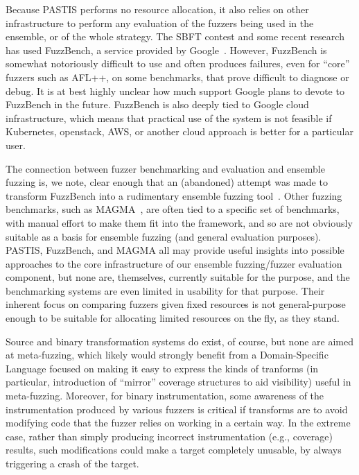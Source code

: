 Because PASTIS performs no resource allocation, it also relies on other 
infrastructure to perform any evaluation of the fuzzers being used in the 
ensemble, or of the whole strategy.  The SBFT contest and some recent research 
has used FuzzBench, a service provided by Google~\cite{metzman2021fuzzbench}.  However, FuzzBench is 
somewhat notoriously difficult to use and often produces failures, even for 
``core'' fuzzers such as AFL++, on some benchmarks, that prove difficult 
to diagnose or debug.  It is at best highly unclear how much support Google 
plans to devote to FuzzBench in the future.  FuzzBench is also deeply
tied to Google cloud infrastructure, which means that practical use of
the system is not feasible if Kubernetes, openstack, AWS, or another
cloud approach is better for a particular user.

The connection between fuzzer 
benchmarking and evaluation and ensemble fuzzing is, we note, clear enough that 
an (abandoned) attempt was made to transform FuzzBench 
into a rudimentary ensemble fuzzing tool~\cite{fuzzbenchensemble}.   Other fuzzing benchmarks, such as 
MAGMA~\cite{MAGMA}, are often tied to a specific set of benchmarks, with manual effort to 
make them fit into the framework, and so are not obviously suitable as a basis 
for ensemble fuzzing (and general evaluation purposes).  PASTIS, FuzzBench, and 
MAGMA all may provide useful insights into possible approaches to the core 
infrastructure of our ensemble fuzzing/fuzzer evaluation component, but none 
are, themselves, currently suitable for the purpose, and the benchmarking 
systems are even limited in usability for that purpose.   Their
inherent focus on comparing fuzzers given fixed resources is not
general-purpose enough to be suitable for allocating limited resources
on the fly, as they stand.


Source and binary transformation systems do exist, of course, but none are 
aimed at meta-fuzzing, which likely would strongly benefit from a 
Domain-Specific Language focused on making it easy to express the kinds of 
tranforms (in particular, introduction of ``mirror'' coverage structures to aid 
visibility) useful in meta-fuzzing.  Moreover, for binary instrumentation, some 
awareness of the instrumentation produced by various fuzzers is critical if 
transforms are to avoid modifying code that the fuzzer relies on working in a 
certain way.  In the extreme case, rather than simply producing incorrect 
instrumentation (e.g., coverage) results, such modifications could make a 
target completely unusable, by always triggering a crash of the
target.


